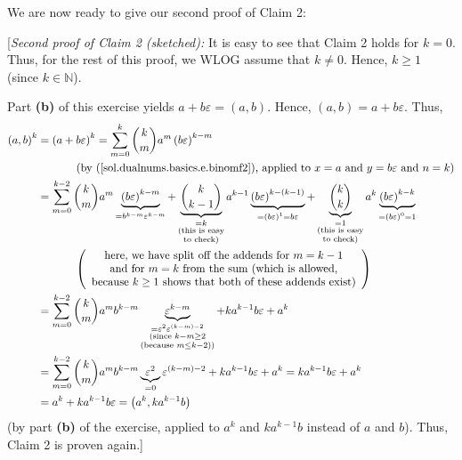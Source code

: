 \documentclass[paper=a4, fontsize=12pt]{scrartcl}%
\let\sumnonlimits\sum
\renewcommand{\sum}{\sumnonlimits\limits}
\theoremstyle{plainsl}
\theoremstyle{definition}
\theoremstyle{remark}
\begin{document}
We are now ready to give our second proof of Claim 2:

[\textit{Second proof of Claim 2 (sketched):} It is easy to see that Claim 2
holds for $k=0$. Thus, for the rest of this proof, we WLOG assume that
$k\neq0$. Hence, $k\geq1$ (since $k\in\mathbb{N}$).

Part \textbf{(b)} of this exercise yields $a+b\varepsilon=\left(  a,b\right)
$. Hence, $\left(  a,b\right)  =a+b\varepsilon$. Thus,%
\begin{align*}
\left(  a,b\right)  ^{k}  &  =\left(  a+b\varepsilon\right)  ^{k}=\sum
_{m=0}^{k}\dbinom{k}{m}a^{m}\left(  b\varepsilon\right)  ^{k-m}\\
&  \ \ \ \ \ \ \ \ \ \ \left(  \text{by (\ref{sol.dualnums.basics.e.binomf2}),
applied to }x=a\text{ and }y=b\varepsilon\text{ and }n=k\right) \\
&  =\sum_{m=0}^{k-2}\dbinom{k}{m}a^{m}\underbrace{\left(  b\varepsilon\right)
^{k-m}}_{=b^{k-m}\varepsilon^{k-m}}+\underbrace{\dbinom{k}{k-1}}%
_{\substack{=k\\\text{(this is easy}\\\text{to check)}}}a^{k-1}%
\underbrace{\left(  b\varepsilon\right)  ^{k-\left(  k-1\right)  }}_{=\left(
b\varepsilon\right)  ^{1}=b\varepsilon}+\underbrace{\dbinom{k}{k}%
}_{\substack{=1\\\text{(this is easy}\\\text{to check)}}}a^{k}%
\underbrace{\left(  b\varepsilon\right)  ^{k-k}}_{=\left(  b\varepsilon
\right)  ^{0}=1}\\
&  \ \ \ \ \ \ \ \ \ \ \left(
\begin{array}
[c]{c}%
\text{here, we have split off the addends for }m=k-1\\
\text{and for }m=k\text{ from the sum (which is allowed,}\\
\text{because }k\geq1\text{ shows that both of these addends exist)}%
\end{array}
\right) \\
&  =\sum_{m=0}^{k-2}\dbinom{k}{m}a^{m}b^{k-m}\underbrace{\varepsilon^{k-m}%
}_{\substack{=\varepsilon^{2}\varepsilon^{\left(  k-m\right)  -2}%
\\\text{(since }k-m\geq2\\\text{(because }m\leq k-2\text{))}}}+ka^{k-1}%
b\varepsilon+a^{k}\\
&  =\sum_{m=0}^{k-2}\dbinom{k}{m}a^{m}b^{k-m}\underbrace{\varepsilon^{2}}%
_{=0}\varepsilon^{\left(  k-m\right)  -2}+ka^{k-1}b\varepsilon+a^{k}%
=ka^{k-1}b\varepsilon+a^{k}\\
&  =a^{k}+ka^{k-1}b\varepsilon=\left(  a^{k},ka^{k-1}b\right)
\end{align*}
(by part \textbf{(b)} of the exercise, applied to $a^{k}$ and $ka^{k-1}b$
instead of $a$ and $b$). Thus, Claim 2 is proven again.]
\end{document}

